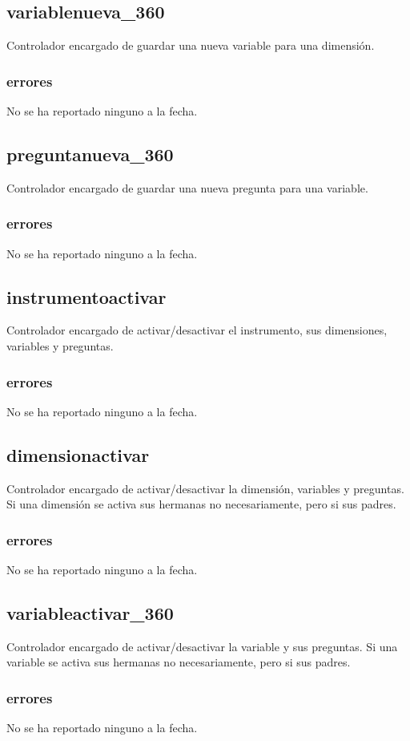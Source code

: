 \documentclass[10pt,a4paper]{book}
\begin{document}
	\subsection{variablenueva\_360}
	Controlador encargado de guardar una nueva variable para una dimensión.
	\subsubsection{errores}
	No se ha reportado ninguno a la fecha.

	\subsection{preguntanueva\_360}
	Controlador encargado de guardar una nueva pregunta para una variable.
	\subsubsection{errores}
	No se ha reportado ninguno a la fecha.

	\subsection{instrumentoactivar}
	Controlador encargado de activar/desactivar el instrumento, sus dimensiones, variables y preguntas.
	\subsubsection{errores}
	No se ha reportado ninguno a la fecha.

	\subsection{dimensionactivar}
	Controlador encargado de activar/desactivar la dimensión, variables y preguntas. Si una dimensión se activa sus hermanas no necesariamente, pero si sus padres.
	\subsubsection{errores}
	No se ha reportado ninguno a la fecha.

	\subsection{variableactivar\_360}
	Controlador encargado de activar/desactivar la variable y sus preguntas. Si una variable se activa sus hermanas no necesariamente, pero si sus padres.
	\subsubsection{errores}
	No se ha reportado ninguno a la fecha.
\end{document}
